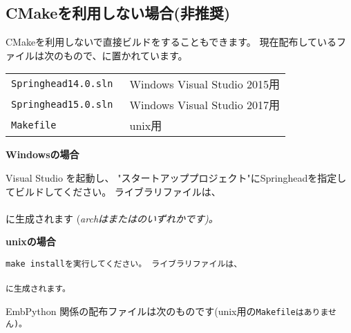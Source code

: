 \subsection{CMakeを利用しない場合(非推奨)}
\label{subsec:DoNotUseCmake}
\parindent=0pt


\bigskip
CMakeを利用しないで直接ビルドをすることもできます。
現在配布しているファイルは次のもので、に置かれています。

\medskip
\begin{narrow}[20pt]
\begin{tabular}{l@{\ \ ---\ \ }l}\hline
	\tt{Springhead14.0.sln} & Windows Visual Studio 2015用 \\
	\tt{Springhead15.0.sln} & Windows Visual Studio 2017用 \\
	\tt{Makefile} & unix用 \\\hline
\end{tabular}
\end{narrow}

\bigskip
\bf{Windowsの場合}
\begin{narrow}
	Visual Studio を起動し、
	"スタートアッププロジェクト"にSpringheadを指定してビルドしてください。
	ライブラリファイルは、\\
	\hspace{20pt} \\
	に生成されます
	(\it{arch}はまたはのいずれかです)。
\end{narrow}

\bf{unixの場合}
\begin{narrow}
	\tt{make install}を実行してください。
	ライブラリファイルは、\\
	\hspace{20pt} \\
	に生成されます。
\end{narrow}

\medskip
\thinrule{\linewidth}

EmbPython 関係の配布ファイルは次のものです(unix用の\tt{Makefile}はありません)。


